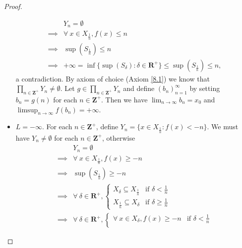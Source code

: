 \begin{proof}
\begin{itemize}
              \begin{align*}
                           & Y_n = \emptyset                                                                                 \\
                  \implies & \forall\ x \in X_{\frac{1}{n}}, f(x) \leq n                                                     \\
                  \implies & \sup(S_{\frac{1}{n}}) \leq n                                                                    \\
                  \implies & +\infty = \inf\{\sup(S_{\delta}) : \delta \in \mathbf{R}^+\} \leq \sup(S_{\frac{1}{n}}) \leq n,
              \end{align*}
              a contradiction.
              By axiom of choice (Axiom \ref{8.1}) we know that \(\prod_{n \in \mathbf{Z}^+} Y_n \neq \emptyset\).
              Let \(g \in \prod_{n \in \mathbf{Z}^+} Y_n\) and define \((b_n)_{n = 1}^\infty\) by setting \(b_n = g(n)\) for each \(n \in \mathbf{Z}^+\).
              Then we have \(\lim_{n \to \infty} b_n = x_0\) and \(\limsup_{n \to \infty} f(b_n) = +\infty\).
        \item \(L = -\infty\).
              For each \(n \in \mathbf{Z}^+\), define \(Y_n = \{x \in X_{\frac{1}{n}} : f(x) < -n\}\).
              We must have \(Y_n \neq \emptyset\) for each \(n \in \mathbf{Z}^+\), otherwise
              \begin{align*}
                           & Y_n = \emptyset                                                       \\
                  \implies & \forall\ x \in X_{\frac{1}{n}}, f(x) \geq -n                          \\
                  \implies & \sup(S_{\frac{1}{n}}) \geq -n                                         \\
                  \implies & \forall\ \delta \in \mathbf{R}^+, \begin{cases}
                      X_{\delta} \subseteq X_{\frac{1}{n}} & \text{if } \delta < \frac{1}{n}    \\
                      X_{\frac{1}{n}} \subseteq X_{\delta} & \text{if } \delta \geq \frac{1}{n}
                  \end{cases}          \\
                  \implies & \forall\ \delta \in \mathbf{R}^+, \begin{cases}
                      \forall\ x \in X_{\delta}, f(x) \geq -n & \text{if } \delta < \frac{1}{n}    \\

\end{cases}
\end{align*}
\end{itemize}
\end{proof}
